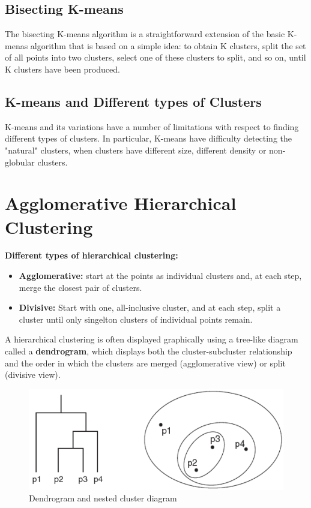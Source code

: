 		\subsection{Bisecting K-means}

		The bisecting K-means algorithm is a straightforward extension of the basic K-menas algorithm
		that is based on a simple idea: to obtain K clusters, split the set of all points into two
		clusters, select one of these clusters to split, and so on, until K clusters have been 
		produced. 

		\subsection{K-means and Different types of Clusters}

		K-means and its variations have a number of limitations with respect to finding different 
		types of clusters. In particular, K-means have difficulty detecting the "natural" clusters,
		when clusters have different size, different density or non-globular clusters. 

		
	\section{Agglomerative Hierarchical Clustering}
		{\bf Different types of hierarchical clustering:}
		\begin{itemize}
			\item {\bf Agglomerative:} start at the points as individual clusters
			and, at each step, merge the closest pair of clusters.
			\item {\bf Divisive:} Start with one, all-inclusive cluster, and at each
			step, split a cluster until only singelton clusters of individual points
			remain. 
		\end{itemize}

		A hierarchical clustering is often displayed graphically using a tree-like diagram
		called a {\bf dendrogram}, which displays both the cluster-subcluster relationship
		and the order in which the clusters are merged (agglomerative view) or split 
		(divisive view). 

		\begin{figure}[H]
			\centering
			\includegraphics[scale=0.3]{pics/hierarchical.png}
			\caption{Dendrogram and nested cluster diagram}
		\end{figure}

